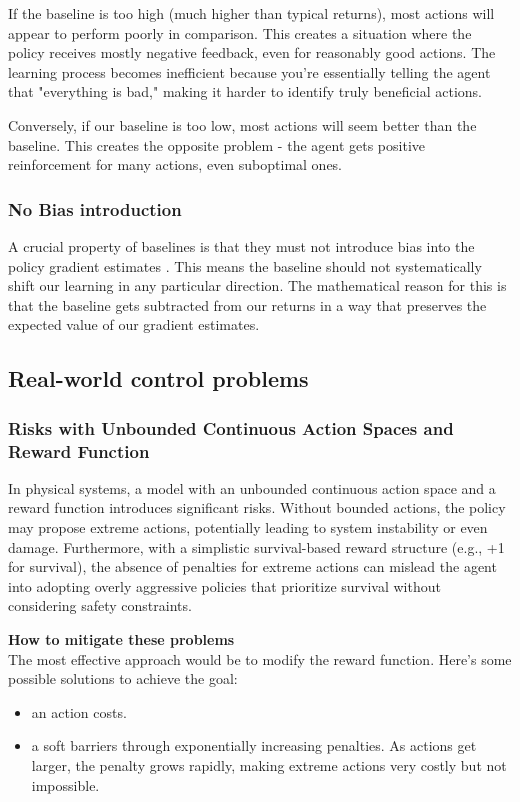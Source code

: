 \documentclass{article}
\begin{document}
If the baseline is too high (much higher than typical returns), most actions will appear to perform poorly in comparison. This creates a situation where the policy receives mostly negative feedback, even for reasonably good actions. The learning process becomes inefficient because you're essentially telling the agent that "everything is bad," making it harder to identify truly beneficial actions.

Conversely, if our baseline is too low, most actions will seem better than the baseline. This creates the opposite problem - the agent gets positive reinforcement for many actions, even suboptimal ones.

\subsubsection{No Bias introduction}
A crucial property of baselines is that they must not introduce bias into the policy gradient estimates  \cite{baseline}. This means the baseline should not systematically shift our learning in any particular direction. The mathematical reason for this is that the baseline gets subtracted from our returns in a way that preserves the expected value of our gradient estimates.

\subsection{Real-world control problems}

\subsubsection{Risks with Unbounded Continuous Action Spaces and Reward Function}
In physical systems, a model with an unbounded continuous action space and a reward function introduces significant risks. Without bounded actions, the policy may propose extreme actions, potentially leading to system instability or even damage. Furthermore, with a simplistic survival-based reward structure (e.g., +1 for survival), the absence of penalties for extreme actions can mislead the agent into adopting overly aggressive policies that prioritize survival without considering safety constraints.

\textbf{How to mitigate these problems} \\
The most effective approach would be to modify the reward function. Here's some possible solutions to achieve the goal:
\begin{itemize}
	\item an action costs. 
	\item a soft barriers through exponentially increasing penalties. As actions get larger, the penalty grows rapidly, making extreme actions very costly but not impossible.
\end{itemize}
\end{document}
